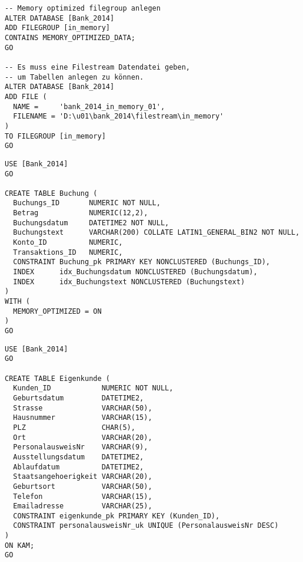 \begin{enumerate}
\begin{lstlisting}[language=ms_sql]
-- Memory optimized filegroup anlegen
ALTER DATABASE [Bank_2014] 
ADD FILEGROUP [in_memory]
CONTAINS MEMORY_OPTIMIZED_DATA; 
GO

-- Es muss eine Filestream Datendatei geben,
-- um Tabellen anlegen zu können.
ALTER DATABASE [Bank_2014]
ADD FILE (
  NAME =     'bank_2014_in_memory_01',
  FILENAME = 'D:\u01\bank_2014\filestream\in_memory'
)
TO FILEGROUP [in_memory]
GO
        \end{lstlisting}
\clearpage        
                
        \begin{lstlisting}[language=ms_sql]
USE [Bank_2014]
GO

CREATE TABLE Buchung (
  Buchungs_ID       NUMERIC NOT NULL,
  Betrag            NUMERIC(12,2),
  Buchungsdatum     DATETIME2 NOT NULL,
  Buchungstext      VARCHAR(200) COLLATE LATIN1_GENERAL_BIN2 NOT NULL,
  Konto_ID          NUMERIC,
  Transaktions_ID   NUMERIC,
  CONSTRAINT Buchung_pk PRIMARY KEY NONCLUSTERED (Buchungs_ID),
  INDEX      idx_Buchungsdatum NONCLUSTERED (Buchungsdatum),
  INDEX      idx_Buchungstext NONCLUSTERED (Buchungstext)
)
WITH (
  MEMORY_OPTIMIZED = ON
)
GO
        \end{lstlisting}
        
        \begin{lstlisting}[language=ms_sql]
USE [Bank_2014]
GO

CREATE TABLE Eigenkunde (
  Kunden_ID            NUMERIC NOT NULL,
  Geburtsdatum         DATETIME2,
  Strasse              VARCHAR(50),
  Hausnummer           VARCHAR(15),
  PLZ                  CHAR(5),
  Ort                  VARCHAR(20),
  PersonalausweisNr    VARCHAR(9),
  Ausstellungsdatum    DATETIME2,
  Ablaufdatum          DATETIME2,
  Staatsangehoerigkeit VARCHAR(20),
  Geburtsort           VARCHAR(50),
  Telefon              VARCHAR(15),
  Emailadresse         VARCHAR(25),
  CONSTRAINT eigenkunde_pk PRIMARY KEY (Kunden_ID),
  CONSTRAINT personalausweisNr_uk UNIQUE (PersonalausweisNr DESC)
)
ON KAM;
GO
        \end{lstlisting}
      

\end{enumerate}
